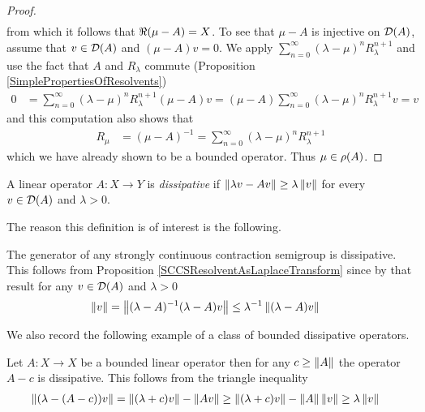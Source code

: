 \begin{proof}
\begin{align*}
\end{align*}
from which it follows that $\Re(\mu - A) = X$.  To see that $\mu - A$ is injective on $\mathcal{D}(A)$, assume that $v \in \mathcal{D}(A)$ and  $(\mu - A) v = 0$.   We
apply $\sum_{n=0}^\infty  (\lambda - \mu)^n R_\lambda^{n+1}$ and use the fact that $A$ and $R_\lambda$ commute (Proposition \ref{SimplePropertiesOfResolvents})
\begin{align*}
0 &=\sum_{n=0}^\infty  (\lambda - \mu)^n R_\lambda^{n+1}  (\mu - A)  v =  (\mu - A)  \sum_{n=0}^\infty  (\lambda - \mu)^n R_\lambda^{n+1} v = v
\end{align*}
and this computation also shows that 
\begin{align*}
R_\mu &= (\mu-A)^{-1} = \sum_{n=0}^\infty  (\lambda - \mu)^n R_\lambda^{n+1}
\end{align*}
which we have already shown to be a bounded operator.  Thus $\mu \in \rho(A)$.
\end{proof}

\begin{defn}A linear operator $A : X \to Y$ is \emph{dissipative} if $\left \lVert \lambda v - A v \right \rVert \geq \lambda \left \lVert v \right \rVert$ for every $v \in \mathcal{D}(A)$ and $\lambda>0$.
\end{defn}

The reason this definition is of interest is the following.
\begin{examp}\label{SCCSGeneratorDissipative}The generator of any strongly continuous contraction semigroup is dissipative. This follows from Proposition \ref{SCCSResolventAsLaplaceTransform} since by that result for any $v \in \mathcal{D}(A)$ and $\lambda > 0$ 
\begin{align*}
\left \lVert v \right \rVert &= \left \lVert (\lambda - A)^{-1} (\lambda -A) v \right \rVert \leq \lambda^{-1} \left \lVert (\lambda -A) v \right \rVert 
\end{align*}
\end{examp}

We also record the following example of a class of bounded dissipative operators.
\begin{examp}\label{BoundedTranslationDissipative}Let $A : X \to X$ be a bounded linear operator then for any $c \geq \left \lVert A \right \rVert$ the operator $A - c$ is dissipative.  This follows from the triangle inequality
\begin{align*}
\left \lVert (\lambda - (A - c))v \right \rVert &= \left \lVert (\lambda + c) v \right \rVert - \left \lVert A v \right \rVert \geq \left \lVert (\lambda + c) v \right \rVert - \left \lVert A \right \rVert \left \lVert v \right \rVert  \geq \lambda \left \lVert v \right \rVert
\end{align*}
\end{examp}

